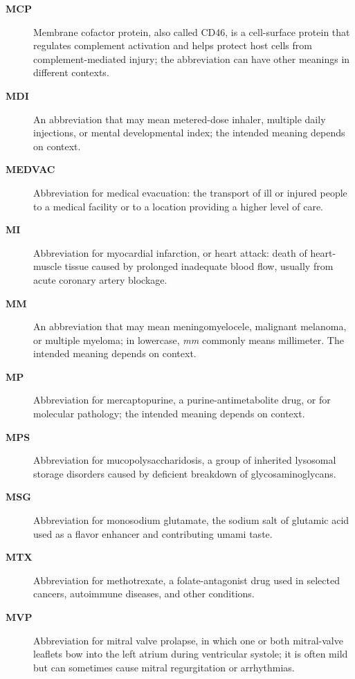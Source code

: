 \begin{description}
\item[\textbf{MCP}] Membrane cofactor protein, also called CD46, is a cell-surface protein that regulates complement activation and helps protect host cells from complement-mediated injury; the abbreviation can have other meanings in different contexts.

\item[\textbf{MDI}] An abbreviation that may mean metered-dose inhaler, multiple daily injections, or mental developmental index; the intended meaning depends on context.

\item[\textbf{MEDVAC}] Abbreviation for medical evacuation: the transport of ill or injured people to a medical facility or to a location providing a higher level of care.

\item[\textbf{MI}] Abbreviation for myocardial infarction, or heart attack: death of heart-muscle tissue caused by prolonged inadequate blood flow, usually from acute coronary artery blockage.

\item[\textbf{MM}] An abbreviation that may mean meningomyelocele, malignant melanoma, or multiple myeloma; in lowercase, \textit{mm} commonly means millimeter. The intended meaning depends on context.

\item[\textbf{MP}] Abbreviation for mercaptopurine, a purine-antimetabolite drug, or for molecular pathology; the intended meaning depends on context.

\item[\textbf{MPS}] Abbreviation for mucopolysaccharidosis, a group of inherited lysosomal storage disorders caused by deficient breakdown of glycosaminoglycans.

\item[\textbf{MSG}] Abbreviation for monosodium glutamate, the sodium salt of glutamic acid used as a flavor enhancer and contributing umami taste.

\item[\textbf{MTX}] Abbreviation for methotrexate, a folate-antagonist drug used in selected cancers, autoimmune diseases, and other conditions.

\item[\textbf{MVP}] Abbreviation for mitral valve prolapse, in which one or both mitral-valve leaflets bow into the left atrium during ventricular systole; it is often mild but can sometimes cause mitral regurgitation or arrhythmias.


\end{description}
